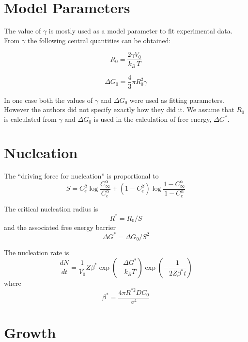 \documentclass[12pt,a4paper]{article}
\begin{document}
\section{Model Parameters}

The value of $\gamma$ is mostly used as a model parameter to fit experimental data. From $\gamma$ the following central quantities can be obtained:

\begin{equation}
R_0 = \frac{2\gamma V_0}{k_B\,T}
\end{equation}

\begin{equation}
\Delta G_0 = \frac{4}{3}\pi R_0^2 \gamma
\end{equation}

In one case \cite{Deschamps-1998-Influenceofpredefo} both the values of $\gamma$ and $\Delta G_0$ were used as fitting parameters. However the authors did not specify exactly how they did it. We assume that $R_0$ is calculated from $\gamma$ and $\Delta G_0$ is used in the calculation of free energy, $\Delta G^*$.

\section{Nucleation}

The ``driving force for nucleation'' is proportional to 
\begin{equation}
S = C_e^\beta \log \frac{C_\infty^\alpha}{C_e^\alpha} + (1-C_e^\beta) \log \frac{1-C_\infty^\alpha}{1-C_e^\alpha}
\end{equation}

The critical nucleation radius is 
\begin{equation}
R^* = R_0 / S
\end{equation}
and the associated free energy barrier
\begin{equation}
\Delta G^* = \Delta G_0 / S^2
\end{equation}

The nucleation rate is
\begin{equation}
\frac{dN}{dt} = \frac{1}{V_0} Z \beta^* 
\exp \left( -\frac{\Delta G^*}{k_B T}\right) 
\exp \left( -\frac{1}{2 Z \beta^* t}\right)
\end{equation}
where
\begin{equation}
\beta^* =\frac{4\pi R^{*2} D C_0}{a^4}
\end{equation}


\section{Growth}
\end{document}

